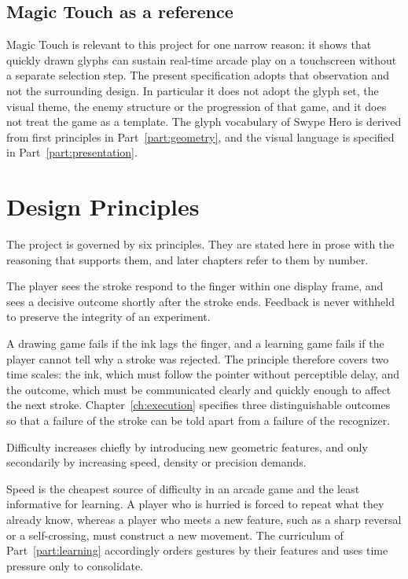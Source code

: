 \section{Magic Touch as a reference}

Magic Touch is relevant to this project for one narrow reason: it shows that quickly drawn glyphs can sustain real-time arcade play on a touchscreen without a separate selection step. The present specification adopts that observation and not the surrounding design. In particular it does not adopt the glyph set, the visual theme, the enemy structure or the progression of that game, and it does not treat the game as a template. The glyph vocabulary of Swype Hero is derived from first principles in Part~\ref{part:geometry}, and the visual language is specified in Part~\ref{part:presentation}.

\chapter{Design Principles}\label{ch:principles}

The project is governed by six principles. They are stated here in prose with the reasoning that supports them, and later chapters refer to them by number.

\begin{principle}\label{pr:feedback}
The player sees the stroke respond to the finger within one display frame, and sees a decisive outcome shortly after the stroke ends. Feedback is never withheld to preserve the integrity of an experiment.
\end{principle}

A drawing game fails if the ink lags the finger, and a learning game fails if the player cannot tell why a stroke was rejected. The principle therefore covers two time scales: the ink, which must follow the pointer without perceptible delay, and the outcome, which must be communicated clearly and quickly enough to affect the next stroke. Chapter~\ref{ch:execution} specifies three distinguishable outcomes so that a failure of the stroke can be told apart from a failure of the recognizer.

\begin{principle}\label{pr:progression}
Difficulty increases chiefly by introducing new geometric features, and only secondarily by increasing speed, density or precision demands.
\end{principle}

Speed is the cheapest source of difficulty in an arcade game and the least informative for learning. A player who is hurried is forced to repeat what they already know, whereas a player who meets a new feature, such as a sharp reversal or a self-crossing, must construct a new movement. The curriculum of Part~\ref{part:learning} accordingly orders gestures by their features and uses time pressure only to consolidate.


